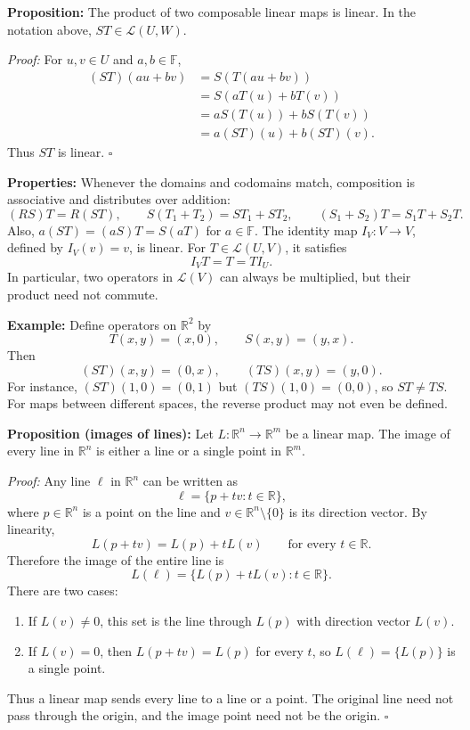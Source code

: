 \documentclass[a4paper,11pt,abstract=true]{scrartcl}
\theoremstyle{dotlessP}
\theoremstyle{dotlessS}
\theoremstyle{remark}
\theoremstyle{definition}
\begin{document}
\begin{claim_box}
\textbf{Proposition:} The product of two composable linear maps is
linear. In the notation above, $ST\in\mathcal{L}(U,W)$.

\textit{Proof:} For $u,v\in U$ and $a,b\in\mathbb{F}$,
\[
\begin{aligned}
(ST)(au+bv)&=S(T(au+bv))\\
&=S(aT(u)+bT(v))\\
&=aS(T(u))+bS(T(v))\\
&=a(ST)(u)+b(ST)(v).
\end{aligned}
\]
Thus $ST$ is linear. \hfill$\square$
\end{claim_box}

\begin{claim_box}
\textbf{Properties:} Whenever the domains and codomains match,
composition is associative and distributes over addition:
\[
(RS)T=R(ST),\qquad
S(T_1+T_2)=ST_1+ST_2,\qquad
(S_1+S_2)T=S_1T+S_2T.
\]
Also, $a(ST)=(aS)T=S(aT)$ for $a\in\mathbb{F}$.
The identity map $I_V:V\longrightarrow V$, defined by $I_V(v)=v$, is
linear. For $T\in\mathcal{L}(U,V)$, it satisfies
\[
I_V T=T=T I_U.
\]
In particular, two operators in $\mathcal{L}(V)$ can always be multiplied,
but their product need not commute.
\end{claim_box}

\begin{example_box}
\textbf{Example:} Define operators on $\mathbb{R}^2$ by
\[
T(x,y)=(x,0),\qquad S(x,y)=(y,x).
\]
Then
\[
(ST)(x,y)=(0,x),\qquad (TS)(x,y)=(y,0).
\]
For instance, $(ST)(1,0)=(0,1)$ but $(TS)(1,0)=(0,0)$, so $ST\neq TS$.
For maps between different spaces, the reverse product may not even be
defined.
\end{example_box}

\begin{claim_box}
\textbf{Proposition (images of lines):} Let
$L:\mathbb{R}^n\longrightarrow\mathbb{R}^m$ be a linear map. The image of
every line in $\mathbb{R}^n$ is either a line or a single point in
$\mathbb{R}^m$.

\textit{Proof:} Any line $\ell$ in $\mathbb{R}^n$ can be written as
\[
\ell=\{p+tv:t\in\mathbb{R}\},
\]
where $p\in\mathbb{R}^n$ is a point on the line and
$v\in\mathbb{R}^n\setminus\{0\}$ is its direction vector. By linearity,
\[
L(p+tv)=L(p)+tL(v)
\qquad\text{for every }t\in\mathbb{R}.
\]
Therefore the image of the entire line is
\[
L(\ell)=\{L(p)+tL(v):t\in\mathbb{R}\}.
\]
There are two cases:
\begin{enumerate}
    \item If $L(v)\neq0$, this set is the line through $L(p)$ with
    direction vector $L(v)$.
    \item If $L(v)=0$, then $L(p+tv)=L(p)$ for every $t$, so
    $L(\ell)=\{L(p)\}$ is a single point.
\end{enumerate}
Thus a linear map sends every line to a line or a point. The original line
need not pass through the origin, and the image point need not be the
origin. \hfill$\square$
\end{claim_box}
\end{document}
